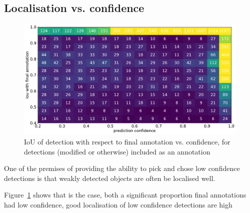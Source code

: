 \subsection{Localisation vs. confidence}
\label{sec:localisation_confidence}

\begin{figure}[ht]
\centering
\includegraphics[width=1.0\linewidth]{charts/scatters/confidence_iou.pdf}
\caption{ IoU of detection with respect to final annotation vs. confidence, for detections (modified or otherwise) included as an annotation }
\label{fig:iou_confidence}
\end{figure}

One of the premises of providing the ability to pick and chose low confidence detections is that weakly detected objects are often be localised well. 

Figure~\ref{fig:iou_confidence} shows that is the case, both a significant proportion final annotations had low confidence, good localisation of low confidence detections are high 

\begin{table}[h]
\caption{Breakdown by dataset of detections included as an annotation; confident if $ p > 0.7 $, precise if $ IoU > 0.85 $ with respect to final annotation} 
\noindent{}
\end{table}

